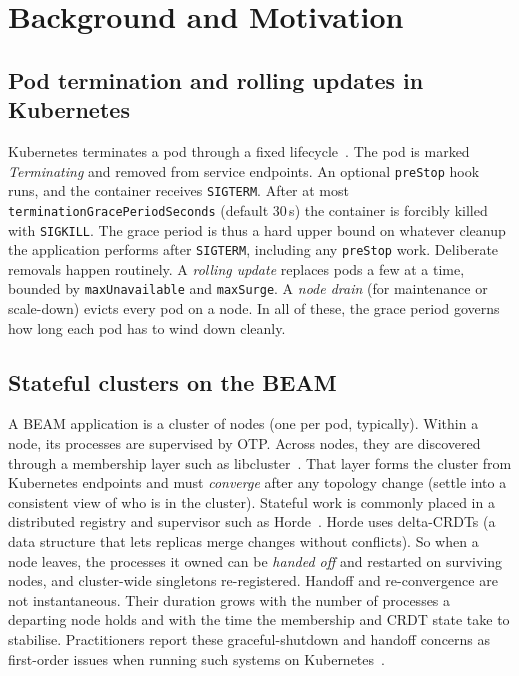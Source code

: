 \documentclass[AMA,Times1COL]{WileyNJDv5}
\begin{document}
\section{Background and Motivation}\label{sec:bg}

\subsection{Pod termination and rolling updates in Kubernetes}\label{sec:bg-k8s}
Kubernetes terminates a pod through a fixed lifecycle~\cite{k8sgraceful}. The pod is marked
\emph{Terminating} and removed from service endpoints. An optional \texttt{preStop} hook runs, and the
container receives \texttt{SIGTERM}. After at most \texttt{terminationGracePeriodSeconds} (default
30\,s) the container is forcibly killed with \texttt{SIGKILL}. The grace period is thus a hard upper
bound on whatever cleanup the application performs after \texttt{SIGTERM}, including any \texttt{preStop}
work. Deliberate removals happen routinely. A \emph{rolling update} replaces pods a few at a time,
bounded by \texttt{maxUnavailable} and \texttt{maxSurge}. A \emph{node drain} (for maintenance or
scale-down) evicts every pod on a node. In all of these, the grace period governs how long each pod
has to wind down cleanly.

\subsection{Stateful clusters on the BEAM}\label{sec:bg-beam}
A BEAM application is a cluster of nodes (one per pod, typically). Within a node, its processes are
supervised by OTP. Across nodes, they are discovered through a membership layer such as
libcluster~\cite{libcluster}. That layer forms the cluster from Kubernetes endpoints and must
\emph{converge} after any topology change (settle into a consistent view of who is in the cluster).
Stateful work is commonly placed in a distributed registry and supervisor such as Horde~\cite{horde}.
Horde uses delta-CRDTs (a data structure that lets replicas merge changes without conflicts). So when a
node leaves, the processes it owned can be \emph{handed off} and restarted on surviving nodes, and
cluster-wide singletons re-registered. Handoff and re-convergence are not instantaneous. Their
duration grows with the number of processes a departing node holds and with the time the membership
and CRDT state take to stabilise. Practitioners report these graceful-shutdown and handoff concerns
as first-order issues when running such systems on Kubernetes~\cite{souza2024dependable}.
\end{document}
